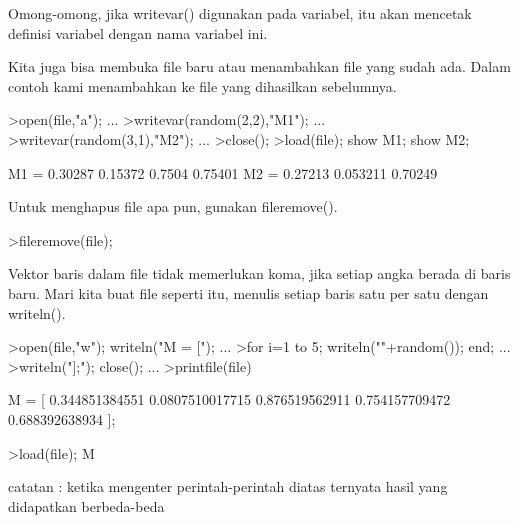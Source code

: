 \documentclass{article}
\begin{document}
\begin{eulernotebook}
\begin{eulercomment}
\begin{eulercomment}
\begin{eulercomment}
Omong-omong, jika writevar() digunakan pada variabel, itu akan
mencetak definisi variabel dengan nama variabel ini.
\end{eulercomment}
\begin{eulercomment}
Kita juga bisa membuka file baru atau menambahkan file yang sudah ada.
Dalam contoh kami menambahkan ke file yang dihasilkan sebelumnya.
\end{eulercomment}
\begin{eulerprompt}
>open(file,"a"); ...
>writevar(random(2,2),"M1"); ...
>writevar(random(3,1),"M2"); ...
>close();
>load(file); show M1; show M2;
\end{eulerprompt}
\begin{euleroutput}
  M1 = 
    0.30287   0.15372 
     0.7504   0.75401 
  M2 = 
    0.27213 
   0.053211 
    0.70249 
\end{euleroutput}
\begin{eulercomment}
Untuk menghapus file apa pun, gunakan fileremove().
\end{eulercomment}
\begin{eulerprompt}
>fileremove(file);
\end{eulerprompt}
\begin{eulercomment}
Vektor baris dalam file tidak memerlukan koma, jika setiap angka
berada di baris baru. Mari kita buat file seperti itu, menulis setiap
baris satu per satu dengan writeln().
\end{eulercomment}
\begin{eulerprompt}
>open(file,"w"); writeln("M = ["); ...
>for i=1 to 5; writeln(""+random()); end; ...
>writeln("];"); close(); ...
>printfile(file)
\end{eulerprompt}
\begin{euleroutput}
  M = [
  0.344851384551
  0.0807510017715
  0.876519562911
  0.754157709472
  0.688392638934
  ];
\end{euleroutput}
\begin{eulerprompt}
>load(file); M
\end{eulerprompt}
\begin{euleroutput}
  [0.34485,  0.080751,  0.87652,  0.75416,  0.68839]
\end{euleroutput}
\begin{eulercomment}
catatan : ketika mengenter perintah-perintah diatas ternyata hasil
yang didapatkan berbeda-beda


\end{eulercomment}
\end{eulercomment}
\end{eulercomment}
\end{eulernotebook}
\end{document}
